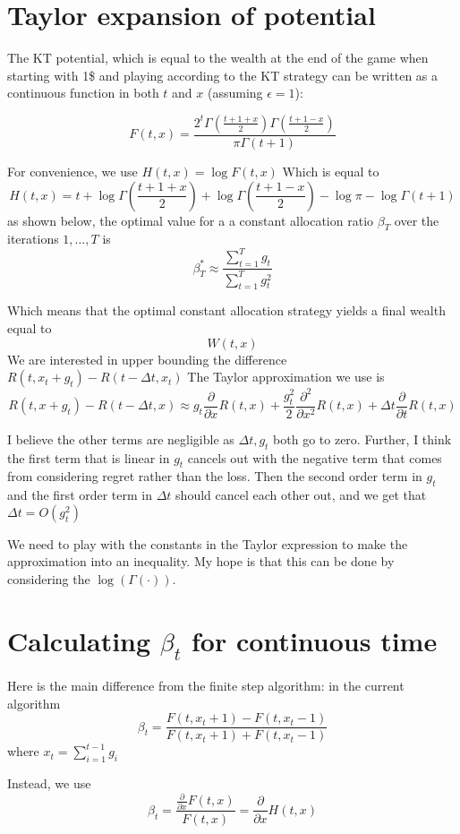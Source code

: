 \documentclass{article}
\newcommand{\dt}{\Delta t}
\begin{document}
\section{Taylor expansion of potential}
The KT potential, which is equal to the wealth at the end of the game when starting with 1\$ and playing according to the KT strategy can be written as a continuous function in both $t$ and $x$ (assuming $\epsilon=1$):

\[
F(t,x) = \frac{2^t \Gamma\left(\frac{t+1+x}{2} \right) \Gamma\left(\frac{t+1-x}{2} \right)}
{\pi \Gamma(t+1)}
\]

For convenience, we use $H(t,x) = \log F(t,x)$ Which is equal to
\[
H(t,x)=t +  \log \Gamma\left(\frac{t+1+x}{2} \right) +\log \Gamma\left(\frac{t+1-x}{2} \right)
- \log \pi - \log \Gamma(t+1)
\]
as shown below, the optimal value for a a constant allocation ratio $\beta_T$ over the iterations $1,\ldots,T$ is 
$$
\beta_T^* \approx \frac{\sum_{t=1}^T g_t}{\sum_{t=1}^T g_t^2}
$$

Which means that the optimal constant allocation strategy yields a final wealth equal to 
\[
W(t,x)
\]
We are interested in upper bounding the difference 
$R(t,x_t+g_t) - R(t-\dt,x_t)$
The Taylor approximation we use is
\[
R(t,x+g_t) - R(t-\dt,x)\approx
g_t \frac{\partial}{\partial x} R(t,x)
+\frac{g_t^2}{2} \frac{\partial^2}{\partial x^2} R(t,x)
+\dt \frac{\partial}{\partial t} R(t,x)
\]

I believe the other terms are negligible as $\dt,g_t$ both go to zero. Further, I think the first term that is linear in $g_t$ cancels out with the negative term that comes from considering regret rather than the loss. Then the second order term in $g_t$ and the first order term in $\dt$ should cancel each other out, and we get that $\dt = O(g_t^2)$

We need to play with the constants in the Taylor expression to make the approximation into an inequality. My hope is that this can be done by
considering the $\log(\Gamma(\cdot))$. 


\section{Calculating $\beta_t$ for continuous time}
Here is the main difference from the finite step algorithm: in the current algorithm
\[
\beta_t = \frac{F(t,x_t+1) - F(t,x_t-1)}{F(t,x_t+1) + F(t,x_t-1)}
\]
where $x_t = \sum_{i=1}^{t-1} g_i$

Instead, we use
\[
\beta_t = \frac{\frac{\partial}{\partial x}F(t,x)}{F(t,x)}
=\frac{\partial}{\partial x} H(t,x)
\]
\end{document}
